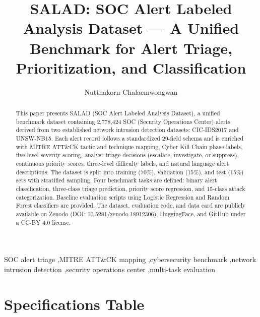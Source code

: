 \documentclass[review]{elsarticle}
\begin{document}
\begin{frontmatter}

\title{SALAD: SOC Alert Labeled Analysis Dataset --- A Unified Benchmark for Alert Triage, Prioritization, and Classification}

\author[1]{Nutthakorn Chalaemwongwan}

\begin{abstract}
This paper presents SALAD (SOC Alert Labeled Analysis Dataset), a unified benchmark dataset containing 2,778,424 SOC (Security Operations Center) alerts derived from two established network intrusion detection datasets: CIC-IDS2017 and UNSW-NB15. Each alert record follows a standardized 29-field schema and is enriched with MITRE ATT\&CK tactic and technique mapping, Cyber Kill Chain phase labels, five-level severity scoring, analyst triage decisions (escalate, investigate, or suppress), continuous priority scores, three-level difficulty labels, and natural language alert descriptions. The dataset is split into training (70\%), validation (15\%), and test (15\%) sets with stratified sampling. Four benchmark tasks are defined: binary alert classification, three-class triage prediction, priority score regression, and 15-class attack categorization. Baseline evaluation scripts using Logistic Regression and Random Forest classifiers are provided. The dataset, evaluation code, and data card are publicly available on Zenodo (DOI: 10.5281/zenodo.18912306), HuggingFace, and GitHub under a CC-BY 4.0 license.
\end{abstract}

\begin{keyword}
SOC alert triage \sep MITRE ATT\&CK mapping \sep cybersecurity benchmark \sep network intrusion detection \sep security operations center \sep multi-task evaluation
\end{keyword}

\end{frontmatter}

\section{Specifications Table}
\end{document}
